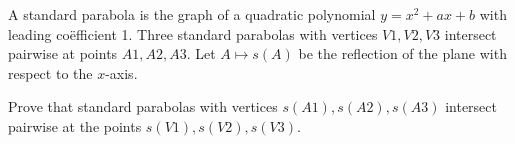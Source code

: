 A standard parabola is the graph of a quadratic polynomial $y = x^2 + ax + b$ with leading co\"efficient 1. Three standard parabolas with vertices $V1, V2, V3$ intersect pairwise at points $A1, A2, A3$. Let $A \mapsto s(A)$ be the reflection of the plane with respect to the $x$-axis.

Prove that standard parabolas with vertices $s (A1), s (A2), s (A3)$ intersect pairwise at the points $s (V1), s (V2), s (V3)$.